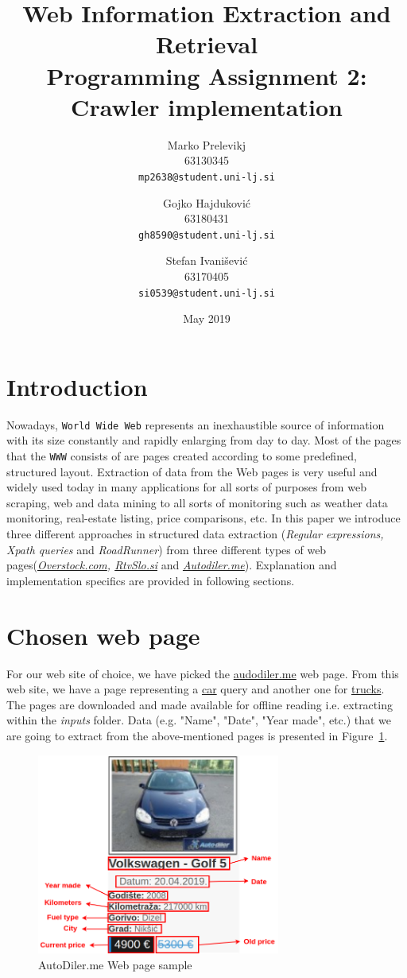\documentclass{article}
\title{
	Web Information Extraction and Retrieval\\
	Programming Assignment 2: \\
	Crawler implementation
}
\author{
	Marko Prelevikj\\
	63130345\\
	\texttt{mp2638@student.uni-lj.si}
	\and
	Gojko Hajduković\\
	63180431\\
	\texttt{gh8590@student.uni-lj.si}
	\and
	Stefan Ivanišević\\
	63170405\\
	\texttt{si0539@student.uni-lj.si}
}
\date{May 2019}
\begin{document}
	
	\maketitle
	
	\section{Introduction}
	Nowadays, \texttt{World Wide Web} represents an inexhaustible source of information with its size constantly and rapidly enlarging from day to day. Most of the pages that the \texttt{WWW} consists of are pages created according to some predefined, structured layout. Extraction of data from the Web pages is very useful and widely used today in many applications for all sorts of purposes from web scraping, web and data mining to all sorts of monitoring such as weather data monitoring, real-estate listing, price comparisons, etc. In this paper we introduce three different approaches in structured data extraction (\textit{Regular expressions, Xpath queries} and \textit{RoadRunner}) from three different types of web pages(\textit{\href{https://www.overstock.com/}{Overstock.com}, \href{https://www.rtvslo.si/}{RtvSlo.si}} and \textit{\href{http://www.autodiler.me}{Autodiler.me}}). Explanation and implementation specifics are provided in following sections.\footnotemark
	
	\section{Chosen web page}
	For our web site of choice, we have picked the \href{http://www.autodiler.me}{audodiler.me} web page. From this web site, we have a page representing a  \href{http://www.autodiler.me/auto_oglasi_auto}{car} query and another one for \href{http://www.autodiler.me/auto_oglasi_kamion}{trucks}. The pages are  downloaded and made available for offline reading i.e. extracting within the \textit{inputs} folder. Data (e.g. "Name", "Date", "Year made", etc.) that we are going to extract from the above-mentioned pages is presented in Figure~\ref{fig:adiler}.
	
	\begin{figure}[H]
		\centering
		\includegraphics[width=8cm]{adiler.png}
		\caption{AutoDiler.me Web page sample}
		\label{fig:adiler}
	\end{figure}
	
\end{document}
